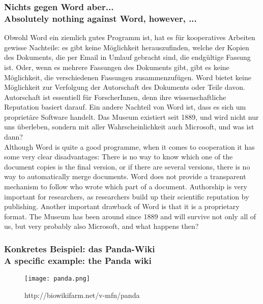 {\scriptsize
\begin{frame}
  \frametitle{Nichts gegen Word\textsuperscript{\tiny\textregistered} aber... \\
    \textcolor{mfn_green}{Absolutely nothing against Word\textsuperscript{\tiny\textregistered}, however, ...}}
  Obwohl Word ein ziemlich gutes Programm ist, hat es für kooperatives Arbeiten gewisse Nachteile: es gibt keine Möglichkeit herauszufinden, welche der Kopien des Dokuments, die per Email in Umlauf gebracht sind, die endgültige Fassung ist. Oder, wenn es mehrere Fassungen des Dokuments gibt, gibt es keine Möglichkeit, die verschiedenen Fassungen zusammenzufügen. Word bietet keine Möglichkeit zur Verfolgung der Autorschaft des Dokuments oder Teile davon. Autorschaft ist essentiell für ForscherInnen, denn ihre wissenschaftliche Reputation basiert darauf. Ein andere Nachteil von Word ist, dass es sich um proprietäre Software handelt. Das Museum existiert seit 1889, und wird nicht nur uns überleben, sondern mit aller Wahrscheinlichkeit auch Microsoft, und was ist dann?\\
  \bigskip
  \textcolor{mfn_green}{Although Word is quite a good programme, when it comes to cooperation it has some very clear disadvantages: There is no way to know which one of the document copies is the final version, or if there are several versions, there is no way to automatically merge documents. Word does not provide a transparent mechanism to follow who wrote which part of a document. Authorship is very important for researchers, as researchers build up their scientific reputation by publishing. Another important drawback of Word is that it is a proprietary format. The Museum has been around since 1889 and will survive not only all of us, but very probably also Microsoft, and what happens then?}
\end{frame}
}
%
%

\begin{frame}
  \frametitle{Konkretes Beispiel: das Panda-Wiki\\\textcolor{mfn_green}{A specific example: the Panda wiki}}
  \begin{figure}
    \texttt{[image: panda.png]}
    \caption{http://biowikifarm.net/v-mfn/panda}
  \end{figure}
\end{frame}


